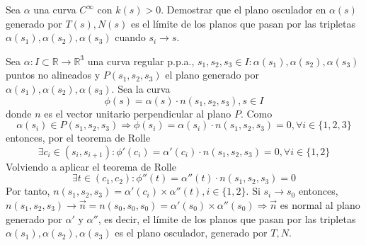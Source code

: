 \begin{ejr}[40]
  Sea $\alpha$ una curva $C^{\infty}$ con $k(s)>0$. Demostrar que el plano osculador en $\alpha(s)$ generado por $T(s), N(s)$ es el límite de los planos que pasan por las tripletas $\alpha(s_{1}), \alpha(s_{2}), \alpha(s_{3})$ cuando $s_{i} \rightarrow s$.
\end{ejr}

\begin{sol}[40]
  Sea $\alpha: I \subset \mathbb{R} \to \mathbb{R}^{3}$ una curva regular p.p.a., $s_{1}, s_{2}, s_{3} \in I : \alpha(s_{1}), \alpha(s_{2}), \alpha(s_{3})$ puntos no alineados y $P(s_{1}, s_{2}, s_{3})$ el plano generado por $\alpha(s_{1}), \alpha(s_{2}), \alpha(s_{3})$. Sea la curva
  \[
    \phi(s) = \alpha(s) \cdot n(s_{1}, s_{2}, s_{3}), s \in I
  \]
  donde $n$ es el vector unitario perpendicular al plano $P$. Como
  \[
    \alpha(s_{i}) \in P(s_{1},s_{2},s_{3})  \Rightarrow \phi(s_{i}) = \alpha(s_{i}) \cdot n(s_{1}, s_{2}, s_{3}) = 0, \forall i \in \{ 1, 2, 3 \}
  \]
  entonces, por el teorema de Rolle
  \[
    \exists c_{i} \in (s_{i},s_{i+1}): \phi'(c_{i})= \alpha'(c_{i}) \cdot n(s_{1}, s_{2}, s_{3}) = 0, \forall i \in \{ 1, 2 \}
  \]
  Volviendo a aplicar el teorema de Rolle
  \[
    \exists t \in (c_{1},c_{2}) : \phi''(t) = \alpha''(t) \cdot n(s_{1},s_{2},s_{3}) = 0
  \]
  Por tanto, $n(s_{1}, s_{2}, s_{3}) = \alpha'(c_{i}) \times \alpha''(t), i \in \{ 1, 2 \}$. Si $s_{i} \rightarrow s_{0}$ entonces, $ n(s_{1}, s_{2}, s_{3}) \rightarrow \vec{n} = n(s_{0},s_{0},s_{0}) = \alpha'(s_{0}) \times \alpha''(s_{0}) \Rightarrow \vec{n}$ es normal al plano generado por $\alpha'$ y $\alpha''$, es decir, el límite de los planos que pasan por las tripletas $\alpha(s_{1}), \alpha(s_{2}), \alpha(s_{3})$ es el plano osculador, generado por $T, N$.
\end{sol}
